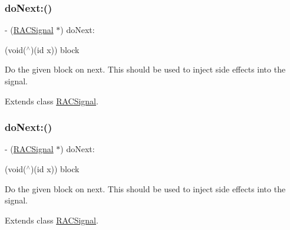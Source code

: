 \subsubsection{\texorpdfstring{do\+Next\+:()}{doNext:()}\hspace{0.1cm}{\footnotesize\ttfamily [1/3]}}
{\footnotesize\ttfamily -\/ (\mbox{\hyperlink{interface_r_a_c_signal}{R\+A\+C\+Signal}} $\ast$) do\+Next\+: \begin{DoxyParamCaption}\item[{(void($^\wedge$)(id x))}]{block }\end{DoxyParamCaption}}

Do the given block on {\ttfamily next}. This should be used to inject side effects into the signal. 

Extends class \mbox{\hyperlink{interface_r_a_c_signal_a36028c2d987159f5210840358f4877c9}{R\+A\+C\+Signal}}.

\mbox{\label{category_r_a_c_signal_07_operations_08_a36028c2d987159f5210840358f4877c9}} 
\subsubsection{\texorpdfstring{do\+Next\+:()}{doNext:()}\hspace{0.1cm}{\footnotesize\ttfamily [2/3]}}
{\footnotesize\ttfamily -\/ (\mbox{\hyperlink{interface_r_a_c_signal}{R\+A\+C\+Signal}} $\ast$) do\+Next\+: \begin{DoxyParamCaption}\item[{(void($^\wedge$)(id x))}]{block }\end{DoxyParamCaption}}

Do the given block on {\ttfamily next}. This should be used to inject side effects into the signal. 

Extends class \mbox{\hyperlink{interface_r_a_c_signal_a36028c2d987159f5210840358f4877c9}{R\+A\+C\+Signal}}.

\mbox{\label{category_r_a_c_signal_07_operations_08_a36028c2d987159f5210840358f4877c9}} 

